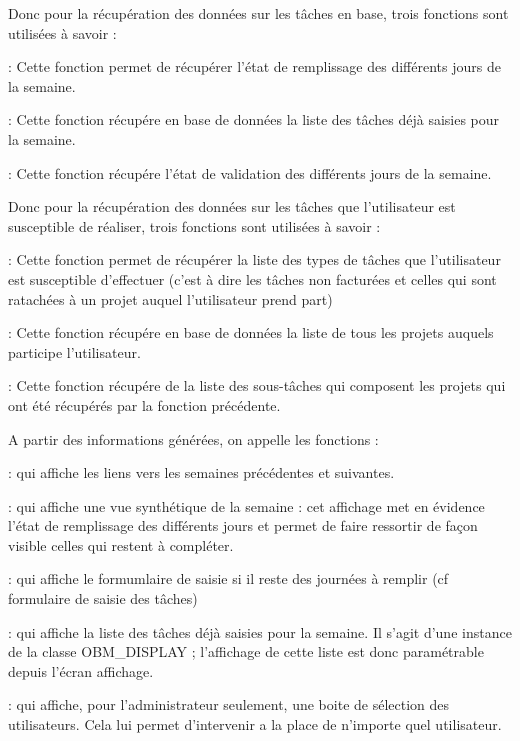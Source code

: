  Donc pour la récupération des données sur les tâches en base, trois fonctions sont utilisées à savoir :
 \begin{description}
  \item{} : Cette fonction permet de récupérer l'état de remplissage des différents jours de la semaine. 
  \item{} : Cette fonction récupére en base de données la liste des tâches déjà saisies pour la semaine.
  \item{} : Cette fonction récupére l'état de validation des différents jours de la semaine. 
 \end{description}

 Donc pour la récupération des données sur les tâches que l'utilisateur est susceptible de réaliser, trois fonctions sont utilisées à savoir :
 \begin{description}
  \item{} : Cette fonction permet de récupérer la liste des types de tâches que l'utilisateur est susceptible d'effectuer (c'est à dire les tâches non facturées et celles qui sont ratachées à un projet auquel l'utilisateur prend part)
  \item{} : Cette fonction récupére en base de données la liste de tous les projets auquels participe l'utilisateur.
  \item{} : Cette fonction récupére de la liste des sous-tâches qui composent les projets qui ont été récupérés par la fonction précédente.
 \end{description}

 A partir des informations générées, on appelle les fonctions :
 \begin{description}
  \item{} : qui affiche les liens vers les semaines précédentes et suivantes.
  \item{} : qui affiche une vue synthétique de la semaine : cet affichage met en évidence l'état de remplissage des différents jours et permet de faire ressortir de façon visible celles qui restent à compléter.
  \item{} : qui affiche le formumlaire de saisie si il reste des journées à remplir (cf formulaire de saisie des tâches)
  \item{} : qui affiche la liste des tâches déjà saisies pour la semaine. Il s'agit d'une instance de la classe OBM\_DISPLAY ; l'affichage de cette liste est donc paramétrable depuis l'écran affichage.
  \item{} : qui affiche, pour l'administrateur seulement, une boite de sélection des utilisateurs. Cela lui permet d'intervenir a la place de n'importe quel utilisateur.
 \end{description}

